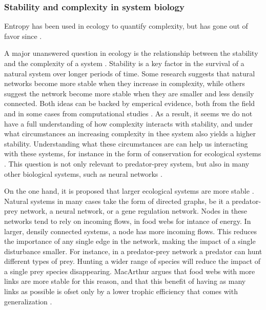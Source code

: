 \documentclass[../main.tex]{subfiles}
\begin{document}
\subsubsection{Stability and complexity in system biology}
Entropy has been used in ecology to quantify complexity, but has gone out of favor since \cite{ulanowicz2001information}.

A major unanswered question in ecology is the relationship between the stability and the complexity of a system \cite{macarthur1955fluctuations, pimm1977number, kondoh2003foraging}.
Stability is a key factor in the survival of a natural system over longer periods of time.
Some research suggests that natural networks become more stable when they increase in complexity, while others suggest the network become more stable when they are smaller and less densily connected.
Both ideas can be backed by emperical evidence, both from the field and in some cases from computational studies \cite{chen2001global, kondoh2003foraging}.
As a result, it seems we do not have a full understanding of how complexity interacts with stability, and under what circumstances an increasing complexity in thee system also yields a higher stability.
Understanding what these circumstances are can help us interacting with these systems, for instance in the form of conservation for ecological systems \cite{kondoh2003foraging}.
This question is not only relevant to predator-prey system, but also in many other biological systems, such as neural networks \cite{tononi1999measures}.

On the one hand, it is proposed that larger ecological systems are more stable \cite{macarthur1955fluctuations}.
Natural systems in many cases take the form of directed graphs, be it a predator-prey network, a neural network, or a gene regulation network.
Nodes in these networks tend to rely on incoming flows, in food webs for intance of energy.
In larger, densily connected systems, a node has more incoming flows.
This reduces the importance of any single edge in the network, making the impact of a single disturbance smaller.
For instance, in a predator-prey network a predator can hunt different types of prey.
Hunting a wider range of species will reduce the impact of a single prey species disappearing.
MacArthur argues that food webs with more links are more stable for this reason, and that this benefit of having as many links as possible is ofset only by a lower trophic efficiency that comes with generalization \cite{macarthur1955fluctuations}.
\end{document}
